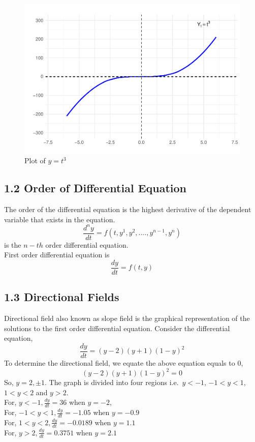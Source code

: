 \documentclass[
  11pt,
]{article}
\begin{document}
\begin{figure}

{\centering \includegraphics{differential_files/figure-latex/difference1-1} 

}

\caption{Plot of $y = t^3$}\label{fig:difference1}
\end{figure}

\subsection{1.2 Order of Differential
Equation}\label{order-of-differential-equation}

The order of the differential equation is the highest derivative of the
dependent variable that exists in the equation.
\[\frac{d^ny}{dt} = f(t, y^1, y^2,...., y^{n-1}, y^n)\] is the \(n-th\)
order differential equation.\\
First order differential equation is \[\frac{dy}{dt} = f(t, y)\]

\subsection{1.3 Directional Fields}\label{directional-fields}

Directional field also known as slope field is the graphical
representation of the solutions to the first order differential
equation. Consider the differential equation,
\[\frac{dy}{dt} = (y-2)(y+1)(1-y)^2\] To determine the directional
field, we equate the above equation equals to 0,
\[(y-2)(y+1)(1-y)^2 = 0\] So, \(y = 2, \pm1\). The graph is divided into
four regions i.e.~\(y <-1\), \(-1 < y < 1\), \(1 < y < 2\) and
\(y > 2\).\\
For, \(y < -1, \frac{dy}{dt} = 36\) when \(y = -2\),\\
For, \(-1 < y < 1, \frac{dy}{dt} = -1.05\) when \(y = -0.9\)\\
For, \(1 < y < 2, \frac{dy}{dt} = -0.0189\) when \(y = 1.1\)\\
For, \(y > 2, \frac{dy}{dt} = 0.3751\) when \(y = 2.1\)\\
\end{document}
